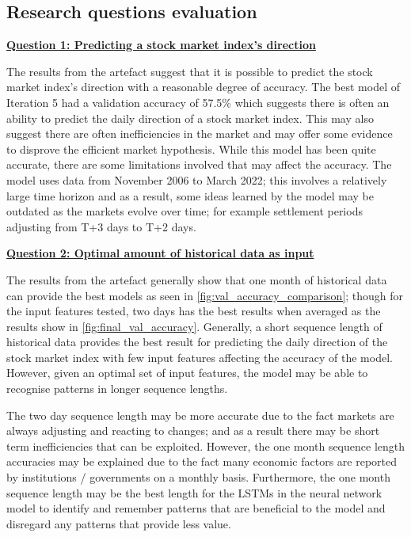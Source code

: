 \subsection{Research questions evaluation}
\hyperref[predicting_direction_question]{\textbf{Question 1: Predicting a stock market index's direction}}


The results from the artefact suggest that it is possible to predict the stock market index's direction
with a reasonable degree of accuracy. The best model of Iteration 5 had a validation accuracy of 57.5\%
which suggests there is often an ability to predict the daily direction of a stock market index. This
may also suggest there are often inefficiencies in the market and may offer some evidence to disprove
the efficient market hypothesis. While this model has been quite accurate, there are some limitations
involved that may affect the accuracy. The model uses data from November 2006 to March 2022; this involves
a relatively large time horizon and as a result, some ideas learned by the model may be outdated as the markets
evolve over time; for example settlement periods adjusting from T+3 days to T+2 days.

\hyperref[optimal_historical_question]{\textbf{Question 2: Optimal amount of historical data as input}}

The results from the artefact generally show that one month of historical data can provide the best models as seen in \autoref{fig:val_accuracy_comparison};
though for the input features tested, two days has the best results when averaged as the results show in \autoref{fig:final_val_accuracy}.
Generally, a short sequence length of historical data provides
the best result for predicting the daily direction of the stock market index with few input features affecting the accuracy of the
model. However, given an optimal set of input features, the model may be able to recognise patterns in longer sequence lengths.

The two day sequence length may be more accurate due to the fact markets are always adjusting and reacting to changes; and as a result
there may be short term inefficiencies that can be exploited. However, the one month sequence length accuracies may be explained due to
the fact many economic factors are reported by institutions / governments on a monthly basis. Furthermore, the one month sequence length
may be the best length for the LSTMs in the neural network model to identify and remember patterns that are beneficial to the model and
disregard any patterns that provide less value.

